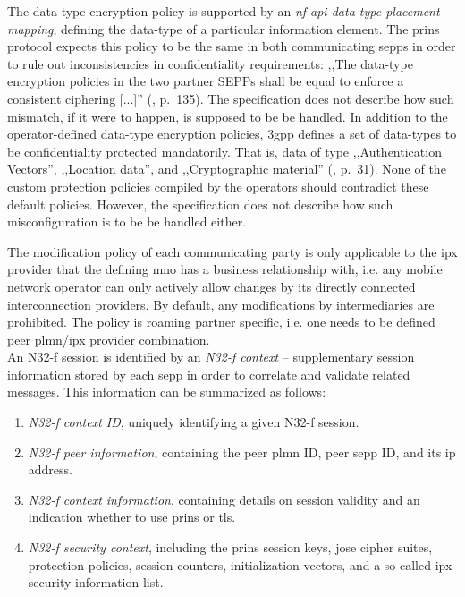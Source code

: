 The data-type encryption policy is supported by an \textit{\gls{nf} \gls{api} data-type placement mapping}, defining the data-type of a particular information element.
The \gls{prins} protocol expects this policy to be the same in both communicating \glspl{sepp} in order to rule out inconsistencies in confidentiality requirements:
,,The data-type encryption policies in the two partner SEPPs shall be equal to enforce a consistent ciphering [...]'' (\cite{3gpp.33.501}, p.~135).
The specification does not describe how such mismatch, if it were to happen, is supposed to be be handled.
In addition to the operator-defined data-type encryption policies, \gls{3gpp} defines a set of data-types to be confidentiality protected mandatorily.
That is, data of type ,,Authentication Vectors'', ,,Location data'', and ,,Cryptographic material'' (\cite{3gpp.33.501}, p.~31).
None of the custom protection policies compiled by the operators should contradict these default policies.
However, the specification does not describe how such misconfiguration is to be be handled either.

The modification policy of each communicating party is only applicable to the \gls{ipx} provider that the defining \gls{mno} has a business relationship with, i.e. any mobile network operator can only actively allow changes by its directly connected interconnection providers.
By default, any modifications by intermediaries are prohibited.
The policy is roaming partner specific, i.e. one needs to be defined peer \gls{plmn}/\gls{ipx} provider combination.
\\

An N32-f session is identified by an \textit{N32-f context} -- supplementary session information stored by each \gls{sepp} in order to correlate and validate related messages.
This information can be summarized as follows:

\begin{enumerate}[label=--]
    \item \textit{N32-f context ID}, uniquely identifying a given N32-f session.
    \item \textit{N32-f peer information}, containing the peer \gls{plmn} ID, peer \gls{sepp} ID, and its \gls{ip} address.
    \item \textit{N32-f context information}, containing details on session validity and an indication whether to use \gls{prins} or \gls{tls}.
    \item \textit{N32-f security context}, including the \gls{prins} session keys, \gls{jose} cipher suites, protection policies, session counters, initialization vectors, and a so-called \gls{ipx} security information list.
\end{enumerate}

